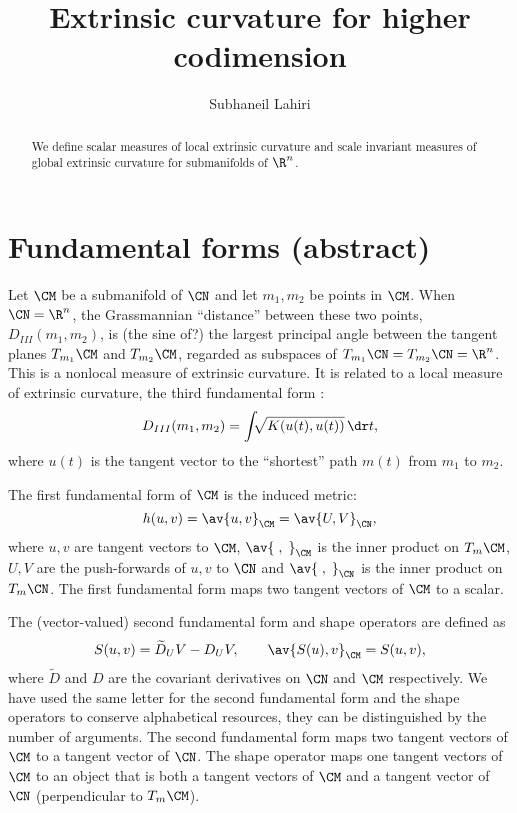 \documentclass[12pt]{article}
\begin{document}
\title{Extrinsic curvature for higher codimension}%
\author{Subhaneil Lahiri}%
\maketitle
\begin{abstract}
  We define scalar measures of local extrinsic curvature and scale invariant measures of global extrinsic curvature for submanifolds of $\R^n$.
\end{abstract}

\section{Fundamental forms (abstract)}\label{sec:fundforms}

Let $\CM$ be a submanifold of $\CN$ and let $m_1,m_2$ be points in $\CM$.
When $\CN=\R^n$, the Grassmannian ``distance'' between these two points, $D_{III}(m_1,m_2)$, is (the sine of?) the largest principal angle between the tangent planes $T_{m_1}\CM$ and $T_{m_2}\CM$, regarded as subspaces of $T_{m_1}\CN = T_{m_2}\CN = \R^n$.
This is a nonlocal measure of extrinsic curvature.
It is related to a local measure of extrinsic curvature, the third fundamental form \cite{clarkson2008tighter}:
%
\begin{equation}\label{eq:grassmannian_dist}
  D_{III}(m_1,m_2) = \int \!\!\! \sqrt{K(u(t),u(t))} \, \dr t,
\end{equation}
%
where $u(t)$ is the tangent vector to the ``shortest'' path $m(t)$ from $m_1$ to $m_2$.

The first fundamental form of $\CM$ is the induced metric:
%
\begin{equation}\label{eq:first_fund}
  h(u,v) = \av{u,v}_\CM = \av{U,V}_{\CN},
\end{equation}
%
where $u,v$ are tangent vectors to $\CM$, $\av{\;,\;}_\CM$ is the inner product on $T_{m}\CM$, $U,V$ are the push-forwards of $u,v$ to $\CN$ and $\av{\;,\;}_{\CN}$ is the inner product on $T_{m}\CN$.
The first fundamental form maps two tangent vectors of $\CM$ to a scalar.

The (vector-valued) second fundamental form and shape operators are defined as \cite[\S V.A]{gallot1990riemannian}
%
\begin{equation}\label{eq:second fund}
  S(u,v) = \widetilde{D}_U V - D_U V,
  \qquad \av{S(u),v}_\CM = S(u,v),
\end{equation}
%
where $\widetilde{D}$ and $D$ are the covariant derivatives on $\CN$ and $\CM$ respectively.
We have used the same letter for the second fundamental form and the shape operators to conserve alphabetical resources, they can be distinguished by the number of arguments.
The second fundamental form maps two tangent vectors of $\CM$ to a tangent vector of $\CN$.
The shape operator maps one tangent vectors of $\CM$ to an object that is both a tangent vectors of $\CM$ and a tangent vector of $\CN$ (perpendicular to $T_m\CM$).
\end{document}
